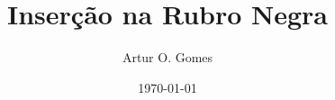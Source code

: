 \documentclass[aspectratio=169]{beamer}
\title{Inserção na Rubro Negra}
\author{Artur O. Gomes}
\institute{SI/CPAN/UFMS}
\date{\today} %
\begin{document}
\begin{frame}
\titlepage
\end{frame}







% 
% 
\end{document}
